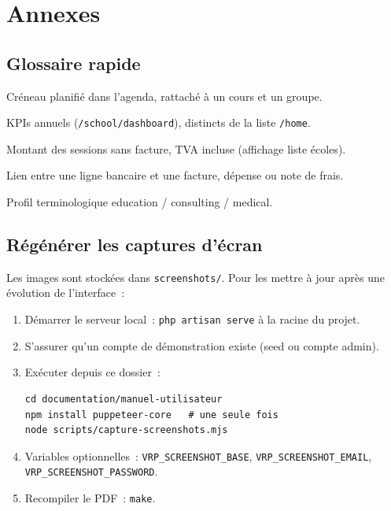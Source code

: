 \chapter{Annexes}
\label{ch:annexes}

\section{Glossaire rapide}

\begin{description}[style=nextline, leftmargin=2.8cm]
  \item[Session] Créneau planifié dans l'agenda, rattaché à un cours et un groupe.
  \item[Plan de charge] KPIs annuels (\texttt{/school/dashboard}), distincts de la liste \texttt{/home}.
  \item[Non facturé TTC] Montant des sessions sans facture, TVA incluse (affichage liste écoles).
  \item[Rapprochement] Lien entre une ligne bancaire et une facture, dépense ou note de frais.
  \item[Contexte métier] Profil terminologique education / consulting / medical.
\end{description}

\section{Régénérer les captures d'écran}
\label{ch:annexes-captures}

Les images sont stockées dans \texttt{screenshots/}. Pour les mettre à jour après une évolution de l'interface~:

\begin{enumerate}[leftmargin=*]
  \item Démarrer le serveur local~: \texttt{php artisan serve} à la racine du projet.
  \item S'assurer qu'un compte de démonstration existe (seed ou compte admin).
  \item Exécuter depuis ce dossier~:
\begin{verbatim}
cd documentation/manuel-utilisateur
npm install puppeteer-core   # une seule fois
node scripts/capture-screenshots.mjs
\end{verbatim}
  \item Variables optionnelles~: \texttt{VRP\_SCREENSHOT\_BASE}, \texttt{VRP\_SCREENSHOT\_EMAIL}, \texttt{VRP\_SCREENSHOT\_PASSWORD}.
  \item Recompiler le PDF~: \texttt{make}.
\end{enumerate}

